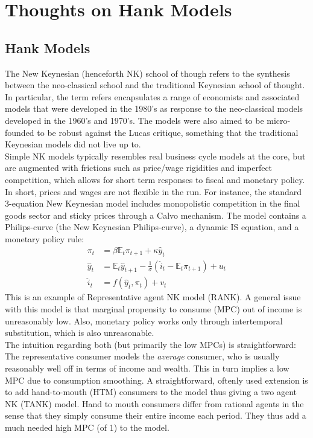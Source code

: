 




\chapter{Thoughts on Hank Models}
\section{Hank Models}
The New Keynesian (henceforth NK) school of though refers to the synthesis between the neo-classical school and the traditional Keynesian school of thought. In particular, the term refers encapsulates a range of economists and associated models that were developed in the 1980's as response to the neo-classical models developed in the 1960's and 1970's. The models were also aimed to be micro-founded to be robust against the Lucas critique, something that the traditional Keynesian models did not live up to. \\
Simple NK models typically resembles real business cycle models at the core, but are augmented with frictions such as price/wage rigidities and imperfect competition, which allows for short term responses to fiscal and monetary policy. In short, prices and wages are not flexible in the run. For instance, the standard 3-equation New Keynesian model includes monopolistic competition in the final goods sector and sticky prices through a Calvo mechanism. 
The model contains a Philips-curve (the New Keynesian Philips-curve), a dynamic IS equation, and a monetary policy rule:  
\begin{align*}
\pi_{t}&=\beta\mathbb{E}_{t}\pi_{t+1}+\kappa\hat{y}_{t} \\
\hat{y}_{t}&=\mathbb{E}_{t}\hat{y}_{t+1}-\frac{1}{\sigma}\left(\hat{i}_{t}-\mathbb{E}_{t}\pi_{t+1}\right)+u_{t} \\
\hat{i}_{t}&=f\left(\hat{y}_{t},\pi_{t}\right)+v_{t}
\end{align*}
This is an example of Representative agent NK model (RANK). A general issue with this model is that marginal propensity to consume (MPC) out of income is unreasonably low. Also, monetary policy works only through intertemporal substitution, which is also unreasonable. \\
The intuition regarding both (but primarily the low MPCs) is straightforward: The representative consumer models the \textit{average} consumer, who is usually reasonably well off in terms of income and wealth. This in turn implies a low MPC due to consumption smoothing. 
A straightforward, oftenly used extension is to add hand-to-mouth (HTM) consumers to the model thus giving a two agent NK (TANK) model. Hand to mouth consumers differ from rational agents in the sense that they simply consume their entire income each period. They thus add a much needed high MPC (of 1) to the model. 

